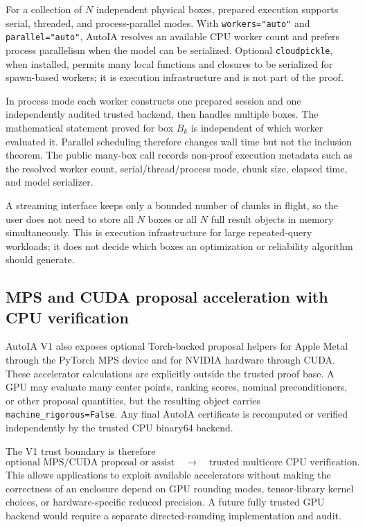 \documentclass[11pt]{article}
\begin{document}
For a collection of \(N\) independent physical boxes, prepared execution supports
serial, threaded, and process-parallel modes.  With
\texttt{workers="auto"} and \texttt{parallel="auto"}, AutoIA resolves an
available CPU worker count and prefers process parallelism when the model can be
serialized.  Optional \texttt{cloudpickle}, when installed, permits many local
functions and closures to be serialized for spawn-based workers; it is execution
infrastructure and is not part of the proof.

In process mode each worker constructs one prepared session and one independently
audited trusted backend, then handles multiple boxes.  The mathematical statement
proved for box \(B_k\) is independent of which worker evaluated it.  Parallel
scheduling therefore changes wall time but not the inclusion theorem.  The public
many-box call records non-proof execution metadata such as the resolved worker
count, serial/thread/process mode, chunk size, elapsed time, and model serializer.

A streaming interface keeps only a bounded number of chunks in flight, so the
user does not need to store all \(N\) boxes or all \(N\) full result objects in
memory simultaneously.  This is execution infrastructure for large repeated-query
workloads; it does not decide which boxes an optimization or reliability algorithm
should generate.

\subsection{MPS and CUDA proposal acceleration with CPU verification}

AutoIA V1 also exposes optional Torch-backed proposal helpers for Apple Metal
through the PyTorch MPS device and for NVIDIA hardware through CUDA.  These
accelerator calculations are explicitly outside the trusted proof base.  A GPU
may evaluate many center points, ranking scores, nominal preconditioners, or other
proposal quantities, but the resulting object carries
\texttt{machine\_rigorous=False}.  Any final AutoIA certificate is recomputed or
verified independently by the trusted CPU binary64 backend.

The V1 trust boundary is therefore
\[
  \boxed{
  \text{optional MPS/CUDA proposal or assist}
  \quad\longrightarrow\quad
  \text{trusted multicore CPU verification}.
  }
\]
This allows applications to exploit available accelerators without making the
correctness of an enclosure depend on GPU rounding modes, tensor-library kernel
choices, or hardware-specific reduced precision.  A future fully trusted GPU
backend would require a separate directed-rounding implementation and audit.
\end{document}

